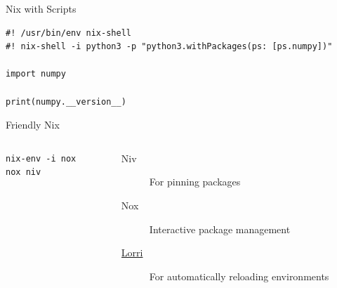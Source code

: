 \documentclass[bigger,unknownkeysallowed,aspectratio=169,colorblocks]{beamer}
\begin{document}
\begin{frame}[label={sec:org2cacc75},fragile]{Nix with Scripts}
 \begin{verbatim}
#! /usr/bin/env nix-shell
#! nix-shell -i python3 -p "python3.withPackages(ps: [ps.numpy])"

import numpy

print(numpy.__version__)
\end{verbatim}
\end{frame}
\begin{frame}[label={sec:orgd2ec866},fragile]{Friendly Nix}
 \begin{columns}
\begin{column}{0.4\columnwidth}
\begin{verbatim}
nix-env -i nox
nox niv
\end{verbatim}
\end{column}
\begin{column}{0.6\columnwidth}
\begin{description}
\item[{Niv}] For pinning packages
\item[{Nox}] Interactive package management
\item[{\href{https://github.com/target/lorri/}{Lorri}}] For automatically reloading environments
\end{description}
\end{column}
\end{columns}
\end{frame}
\end{document}
